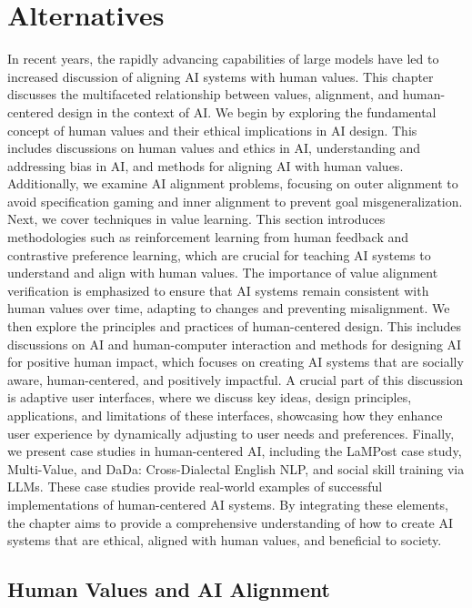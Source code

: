 \documentclass[
  letterpaper,
  numbers=noenddot,
  DIV=11]{scrreprt}
\let\oldchapter\chapter
\def\chapter{%
  \setcounter{sidenote}{1}%
  \oldchapter
}
\theoremstyle{plain}
\theoremstyle{definition}
\theoremstyle{remark}
\begin{document}
\chapter{Alternatives}\label{alternatives}

In recent years, the rapidly advancing capabilities of large models have
led to increased discussion of aligning AI systems with human values.
This chapter discusses the multifaceted relationship between values,
alignment, and human-centered design in the context of AI. We begin by
exploring the fundamental concept of human values and their ethical
implications in AI design. This includes discussions on human values and
ethics in AI, understanding and addressing bias in AI, and methods for
aligning AI with human values. Additionally, we examine AI alignment
problems, focusing on outer alignment to avoid specification gaming and
inner alignment to prevent goal misgeneralization. Next, we cover
techniques in value learning. This section introduces methodologies such
as reinforcement learning from human feedback and contrastive preference
learning, which are crucial for teaching AI systems to understand and
align with human values. The importance of value alignment verification
is emphasized to ensure that AI systems remain consistent with human
values over time, adapting to changes and preventing misalignment. We
then explore the principles and practices of human-centered design. This
includes discussions on AI and human-computer interaction and methods
for designing AI for positive human impact, which focuses on creating AI
systems that are socially aware, human-centered, and positively
impactful. A crucial part of this discussion is adaptive user
interfaces, where we discuss key ideas, design principles, applications,
and limitations of these interfaces, showcasing how they enhance user
experience by dynamically adjusting to user needs and preferences.
Finally, we present case studies in human-centered AI, including the
LaMPost case study, Multi-Value, and DaDa: Cross-Dialectal English NLP,
and social skill training via LLMs. These case studies provide
real-world examples of successful implementations of human-centered AI
systems. By integrating these elements, the chapter aims to provide a
comprehensive understanding of how to create AI systems that are
ethical, aligned with human values, and beneficial to society.

\section{Human Values and AI
Alignment}\label{human-values-and-ai-alignment}
\end{document}
